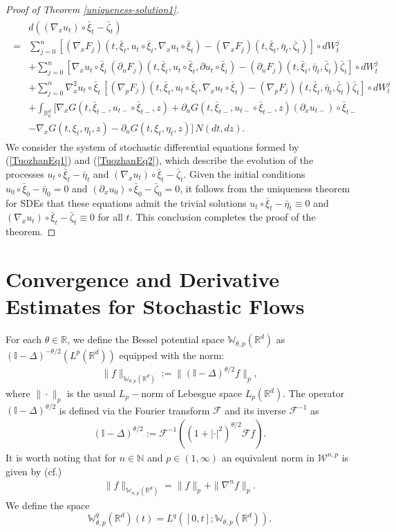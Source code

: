 \documentclass[12pt,oneside, reqno]{amsart}
\newcommand{\be}{\begin{eqnarray}}
\newcommand{\ee}{\end{eqnarray}}
\newcommand{\ce}{\begin{eqnarray*}}
\newcommand{\de}{\end{eqnarray*}}
\def\W{{\mathcal W}}
\def\cF{{\mathcal F}}
\def\mI{{\mathbb I}}
\def\mN{{\mathbb N}}
\def\mR{{\mathbb R}}
\def\mW{{\mathbb W}}
\numberwithin{equation}{section}
\begin{document}
\begin{proof}[Proof of Theorem \ref{uniqueness-solution1}]
  \be\label{TuozhanEq2} 
  \begin{split}
 &d((\nabla_x u_t)\circ \bar{\xi}_t-\bar{\zeta}_t)\\
 =&\sum_{j=0}^n\left[(\nabla_x F_j)(t,\bar{\xi}_t, u_t\circ \bar{\xi}_t,\nabla_x u_t\circ\bar{\xi}_t)- (\nabla_x F_j)(t,\bar{\xi}_t, \bar{\eta}_t,  \bar{\zeta}_t)\right]\circ dW_t^j\\
 &+\sum_{j=0}^n\left[\nabla_x u_t\circ\bar{\xi}_t\,(\partial_u F_j)(t,\bar{\xi}_t, u_t\circ \bar{\xi}_t,\partial u_t\circ\bar{\xi}_t)-(\partial_u F_j)(t,\bar{\xi}_t, \bar{\eta}_t,  \bar{\zeta}_t)\bar{\zeta}_t\right]\circ dW_t^j\\
  &+\sum_{j=0}^n\nabla_x^2 u_t\circ\bar{\xi}_t\,\left[(\nabla_p F_j)(t,\bar{\xi}_t, u_t\circ \bar{\xi}_t,\nabla_x u_t\circ\bar{\xi}_t)-(\nabla_p F_j)(t,\bar{\xi}_t, \bar{\eta}_t,  \bar{\zeta}_t)\bar{\zeta}_t\right]\circ dW_t^j\\
 &+\int_{\mR^d_0}\bigg[ \nabla_x G(t,\bar{\xi}_{t-},u_{t-}\circ\bar{\xi}_{t-},z)+ \partial_u G(t,\bar{\xi}_{t-},u_{t-}\circ\bar{\xi}_{t-},z)(\partial_xu_{t-})\circ\bar{\xi}_{t-}\\
 &-\nabla_x G(t,\xi_t,\eta_t,z)-\partial_u G(t,\xi_t,\eta_t,z)\bigg]\,N(dt,dz).
\end{split}
 \ee 
 We consider the system of stochastic differential equations  formed by (\ref{TuozhanEq1}) and  (\ref{TuozhanEq2}), which describe the evolution of the processes $u_t\circ \bar{\xi}_t-\bar{\eta}_t$ and $(\nabla_x u_t)\circ \bar{\xi}_t-\bar{\zeta}_t$. Given the initial conditions $u_0\circ \bar{\xi}_0-\bar{\eta}_0=0$ and $(\partial_x u_0)\circ \bar{\xi}_0-\bar{\zeta}_0=0$, it follows from the uniqueness theorem for SDEs that these equations admit the trivial solutions  $u_t\circ \bar{\xi}_t-\bar{\eta}_t\equiv 0$ and $(\nabla_x u_t)\circ \bar{\xi}_t-\bar{\zeta}_t\equiv 0$ for all $t$. This conclusion completes the proof of the theorem.
 
  \end{proof}

\section{Convergence and Derivative Estimates for Stochastic Flows }

	For each $\theta\in\mR$, we define the Bessel potential space $\mW_{\theta,p}(\mR^d)$ as $(\mI-\Delta)^{-\theta/2}(L^p(\mR^d))$ equipped with the norm: 
\ce 
\|f\|_{{\mW}_{\theta,p}(\mR^d)}:=\|(\mI-\Delta)^{\theta/2}f\|_{p},
\de 
where $\|\cdot\|_p$ is the usual $L_p-$norm of Lebesgue space $L_p(\mR^d)$. The operator $(\mI-\Delta)^{\theta/2}$ is defined via the Fourier transform $\cF$ and its inverse $\cF^{-1}$ as 
\ce 
(\mI-\Delta)^{\theta/2}:=\cF^{-1}((1+|\cdot|^2)^{\theta/2}\cF f).
\de 
It is worth noting that for  $n\in \mN$ and $p\in(1,\infty)$ an equivalent norm in $\W^{n,p}$ is given by (cf.\cite{Stein1970})
\ce 
\|f\|_{\mW_{n,p}(\mR^d)}=\|f\|_p+\|\nabla^n f\|_p.
\de 
We define the space $$\mW^q_{\theta,p}(\mR^d)(t)=L^q([0,t];\mW_{\theta,p}(\mR^d)).$$
\end{document}
